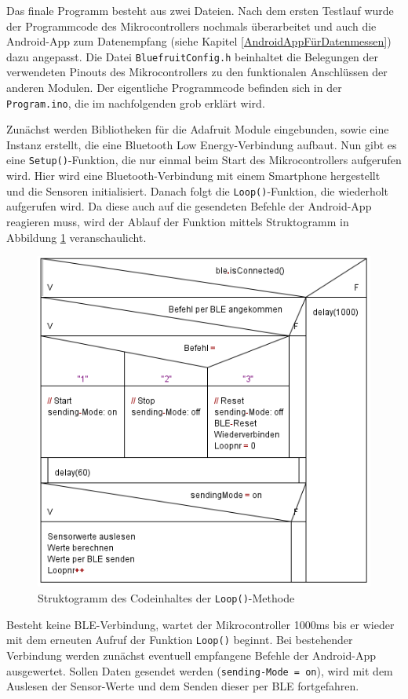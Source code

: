 Das finale Programm besteht aus zwei Dateien. Nach dem ersten Testlauf wurde der Programmcode des Mikrocontrollers nochmals überarbeitet und auch die Android-App zum Datenempfang (siehe Kapitel \ref{AndroidAppFürDatenmessen}) dazu angepasst. Die Datei \texttt{BluefruitConfig.h} beinhaltet die Belegungen der verwendeten Pinouts des Mikrocontrollers zu den funktionalen Anschlüssen der anderen Modulen. Der eigentliche Programmcode befinden sich in der \texttt{Program.ino}, die im nachfolgenden grob erklärt wird.

Zunächst werden Bibliotheken für die Adafruit Module eingebunden, sowie eine Instanz erstellt, die eine Bluetooth Low Energy-Verbindung aufbaut. Nun gibt es eine \texttt{Setup()}-Funktion, die nur einmal beim Start des Mikrocontrollers aufgerufen wird. Hier wird eine Bluetooth-Verbindung mit einem Smartphone hergestellt und die Sensoren initialisiert. Danach folgt die \texttt{Loop()}-Funktion, die wiederholt aufgerufen wird. Da diese auch auf die gesendeten Befehle der Android-App reagieren muss, wird der Ablauf der Funktion mittels Struktogramm in Abbildung \ref{fig:k3_loopstructo} veranschaulicht.

\begin{figure}[h]
	\centering
	\includegraphics{images/k3-loopstructo.png}
	\caption {Struktogramm des Codeinhaltes der \texttt{Loop()}-Methode}
	\label{fig:k3_loopstructo}
\end{figure}

Besteht keine BLE-Verbindung, wartet der Mikrocontroller 1000ms bis er wieder mit dem erneuten Aufruf der Funktion \texttt{Loop()} beginnt. Bei bestehender Verbindung werden zunächst eventuell empfangene Befehle der Android-App ausgewertet. Sollen Daten gesendet werden (\texttt{sending-Mode = on}), wird mit dem Auslesen der Sensor-Werte und dem Senden dieser per BLE fortgefahren. 

